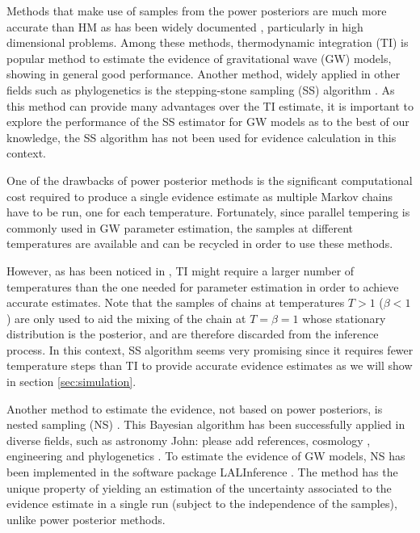 \documentclass[aps,reprint,amsmath,amssymb,showpacs,showkeys]{revtex4-1}%
\newcommand{\cb}{ \color{blue}}
\begin{document}
Methods  that make use of samples from the power posteriors are much more accurate than HM as has been widely documented \citep{Lartillot:Philippe:2006, Newton:Raftery:1994, Xie:Lewis:Fan:Kuo:Chen:2011}, particularly in high dimensional problems.  Among these methods, thermodynamic integration (TI) \citep{Lartillot:Philippe:2006} is popular method to estimate the  evidence  of gravitational wave (GW) models, showing in general good performance.  Another method, widely applied in other fields such as phylogenetics is the stepping-stone sampling (SS) algorithm \citep{Xie:Lewis:Fan:Kuo:Chen:2011}.  As this method
can provide many advantages over the TI estimate, it is important to explore the performance of  the SS estimator  for GW models as  to the best of our knowledge,  the  SS algorithm has not been used for evidence calculation in this context.

One of the drawbacks of power posterior methods is the significant computational cost required to produce a single evidence estimate as 
multiple Markov chains have to be run, one for each temperature.  Fortunately, since  parallel tempering is commonly used in GW parameter estimation, the samples at different temperatures are available and can be recycled in order to use these methods.

However, as has been noticed in \cite{Veitch:2015}, TI might require a larger number of temperatures than the one needed for parameter estimation in order to achieve accurate estimates.  Note that the samples of chains  at  temperatures $T>1$ ($\beta<1$) are only used to aid the mixing of  the chain at $T=\beta=1$ whose stationary distribution is the posterior, and  are therefore discarded from the inference process.  In this context, SS algorithm seems very promising since  it requires fewer temperature steps than TI to provide accurate evidence estimates as we will show in section \ref{sec:simulation}.

Another method to estimate the evidence,  not based on power posteriors, is nested sampling (NS) \citep{Skilling:2006, Veitch:2010}.  This Bayesian algorithm has been successfully applied in diverse fields, such as astronomy \citep{Brewer:Donovan:2015} {\cb John: please add references}, cosmology \citep{Feroz:2009},  engineering \citep{Henderson:2017} and phylogenetics \citep{Maturana:2017b, Maturana:2018}. To estimate the evidence of GW models, NS has been implemented in the software package LALInference \citep{Veitch:2015}.  The method has the unique property of yielding an estimation of the uncertainty associated to the evidence estimate in a single run (subject to the independence of the samples), unlike power posterior methods.
\end{document}
